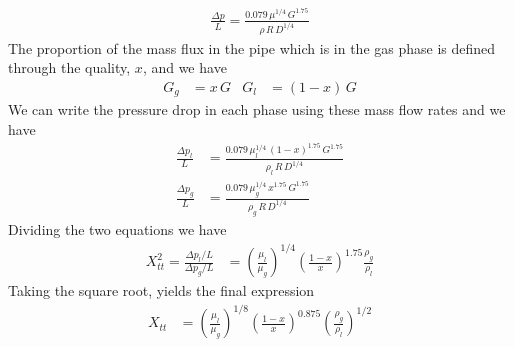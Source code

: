 \documentclass[calculator,datasheet,handbook]{exam}
\begin{document}
\begin{question}
\begin{enumerate}[a)]
{\begin{align*}
        \frac{\Delta p}{L} =
        \frac{0.079\,\mu^{1/4}\,G^{1.75}}{\rho\,R\,D^{1/4}}
      \end{align*}
      The proportion of the mass flux in the pipe which is in the
      gas phase is defined through the quality, $x$, and we have
      \begin{align*}
        G_g&=x\,G & G_l&=\left(1-x\right)\,G
      \end{align*}
      We can write the pressure drop in each phase using these mass
      flow rates and we have
      \begin{align*}
        \frac{\Delta p_l}{L} &=
        \frac{0.079\,\mu_l^{1/4}\,\left(1-x\right)^{1.75}\,G^{1.75}}{\rho_l\,R\,D^{1/4}}\\
        \frac{\Delta p_g}{L} &=
        \frac{0.079\,\mu_g^{1/4}\,x^{1.75}\,G^{1.75}}{\rho_g\,R\,D^{1/4}}
      \end{align*}
      Dividing the two equations we have
      \begin{align*}
        X_{tt}^2 = \frac{\Delta p_l/L}{\Delta p_g/L} &=
        \left(\frac{\mu_l}{\mu_g}\right)^{1/4}\left(\frac{1-x}{x}\right)^{1.75}\frac{\rho_g}{\rho_l}
      \end{align*}
      Taking the square root, yields the final expression
      \begin{align*}
        X_{tt} &= \left(\frac{\mu_l}{\mu_g}\right)^{1/8}
        \left(\frac{1-x}{x}\right)^{0.875}
        \left(\frac{\rho_g}{\rho_l}\right)^{1/2}
      \end{align*}
      
}
\end{enumerate}
\end{question}
\end{document}
